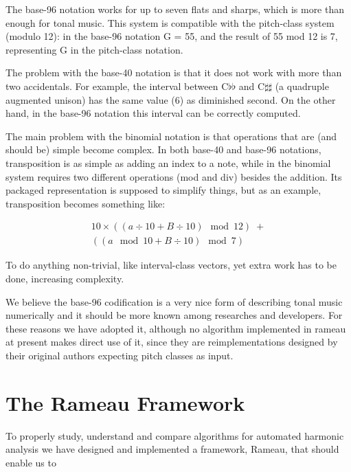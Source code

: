 \documentclass{article}
\newcounter{notacounter}
\newcommand{\nota}[1]{
  \addtocounter{notacounter}{1}
  \textcolor{red}{[nota \arabic{notacounter}: #1]}
}
\begin{document}
The base-96 notation works for up to seven flats and sharps, which is
more than enough for tonal music. This system is compatible with the
pitch-class system (modulo 12): in the base-96 notation G = 55, and
the result of 55 mod 12 is 7, representing G in the pitch-class
notation. 

The problem with the base-40 notation is that it does not work with
more than two accidentals. For example, the interval between
C$\flat\flat$ and C$\sharp\sharp$ (a quadruple augmented unison) has
the same value (6) as diminished second. On the other hand, in the
base-96 notation this interval can be correctly computed.

The main problem with the binomial notation is that operations that
are (and should be) simple become complex. In both base-40 and base-96
notations, transposition is as simple as adding an index to a note,
while in the binomial system requires two different operations (mod
and div) besides the addition. Its packaged representation is supposed
to simplify things, but as an example, transposition becomes something
like:

\begin{eqnarray}
10\times((a \div 10 + B \div 10) \mod 12)\; + \nonumber \\
((a \mod 10 + B \div 10) \mod 7)
\end{eqnarray}

To do anything non-trivial, like interval-class vectors, yet extra
work has to be done, increasing complexity.

We believe the base-96 codification is a very nice form of describing
tonal music numerically and it should be more known among researches
and developers. For these reasons we have adopted it, although no
algorithm implemented in rameau at present makes direct use of it,
since they are reimplementations designed by their original authors
expecting pitch classes as input. 

\section{The Rameau Framework}
\label{sec:system}

To properly study, understand and compare algorithms for automated
harmonic analysis we have designed and implemented a framework,
Rameau, that should enable us to
\end{document}
